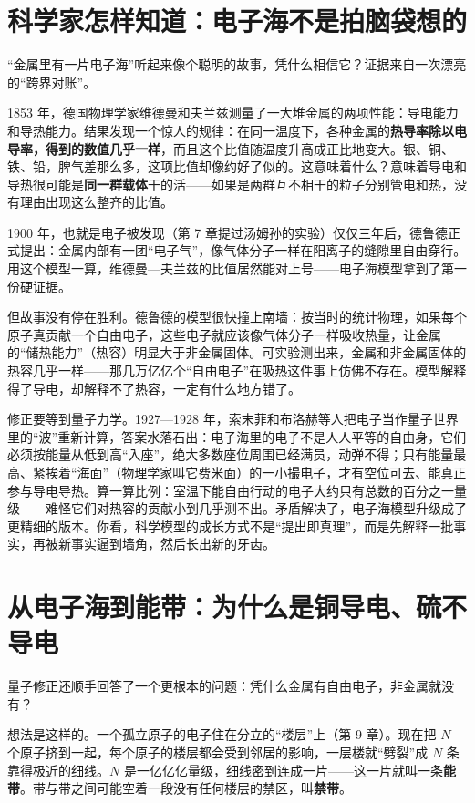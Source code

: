 \section{科学家怎样知道：电子海不是拍脑袋想的}

\begin{zhengju}
“金属里有一片电子海”听起来像个聪明的故事，凭什么相信它？证据来自一次漂亮的“跨界对账”。

1853 年，德国物理学家维德曼和夫兰兹测量了一大堆金属的两项性能：导电能力和导热能力。结果发现一个惊人的规律：在同一温度下，各种金属的\textbf{热导率除以电导率，得到的数值几乎一样}，而且这个比值随温度升高成正比地变大。银、铜、铁、铅，脾气差那么多，这项比值却像约好了似的。这意味着什么？意味着导电和导热很可能是\textbf{同一群载体}干的活——如果是两群互不相干的粒子分别管电和热，没有理由出现这么整齐的比值。

1900 年，也就是电子被发现（第 7 章提过汤姆孙的实验）仅仅三年后，德鲁德正式提出：金属内部有一团“电子气”，像气体分子一样在阳离子的缝隙里自由穿行。用这个模型一算，维德曼—夫兰兹的比值居然能对上号——电子海模型拿到了第一份硬证据。

但故事没有停在胜利。德鲁德的模型很快撞上南墙：按当时的统计物理，如果每个原子真贡献一个自由电子，这些电子就应该像气体分子一样吸收热量，让金属的“储热能力”（热容）明显大于非金属固体。可实验测出来，金属和非金属固体的热容几乎一样——那几万亿亿个“自由电子”在吸热这件事上仿佛不存在。模型解释得了导电，却解释不了热容，一定有什么地方错了。

修正要等到量子力学。1927—1928 年，索末菲和布洛赫等人把电子当作量子世界里的“波”重新计算，答案水落石出：电子海里的电子不是人人平等的自由身，它们必须按能量从低到高“入座”，绝大多数座位周围已经满员，动弹不得；只有能量最高、紧挨着“海面”（物理学家叫它费米面）的一小撮电子，才有空位可去、能真正参与导电导热。算一算比例：室温下能自由行动的电子大约只有总数的百分之一量级——难怪它们对热容的贡献小到几乎测不出。矛盾解决了，电子海模型升级成了更精细的版本。你看，科学模型的成长方式不是“提出即真理”，而是先解释一批事实，再被新事实逼到墙角，然后长出新的牙齿。
\end{zhengju}

\section{从电子海到能带：为什么是铜导电、硫不导电}

量子修正还顺手回答了一个更根本的问题：凭什么金属有自由电子，非金属就没有？

想法是这样的。一个孤立原子的电子住在分立的“楼层”上（第 9 章）。现在把 $N$ 个原子挤到一起，每个原子的楼层都会受到邻居的影响，一层楼就“劈裂”成 $N$ 条靠得极近的细线。$N$ 是一亿亿亿量级，细线密到连成一片——这一片就叫一条\textbf{能带}。带与带之间可能空着一段没有任何楼层的禁区，叫\textbf{禁带}。

